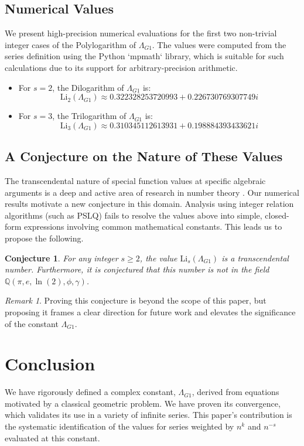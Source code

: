 \documentclass{amsart}
\theoremstyle{plain}
\newtheorem{conjecture}[theorem]{Conjecture}
\theoremstyle{definition}
\theoremstyle{remark}
\newtheorem*{remark}{Remark}
\newcommand{\LambdaG}{\Lambda_{G1}}
\begin{document}
\subsection{Numerical Values}
We present high-precision numerical evaluations for the first two non-trivial integer cases of the Polylogarithm of $\LambdaG$. The values were computed from the series definition using the Python `mpmath` library, which is suitable for such calculations due to its support for arbitrary-precision arithmetic.
\begin{itemize}
    \item For $s=2$, the Dilogarithm of $\LambdaG$ is:
    $$ \mathrm{Li}_2(\LambdaG) \approx 0.322328253720993 + 0.226730769307749i $$
    \item For $s=3$, the Trilogarithm of $\LambdaG$ is:
    $$ \mathrm{Li}_3(\LambdaG) \approx 0.310345112613931 + 0.198884393433621i $$
\end{itemize}

\subsection{A Conjecture on the Nature of These Values}
The transcendental nature of special function values at specific algebraic arguments is a deep and active area of research in number theory \cite{Lewin}. Our numerical results motivate a new conjecture in this domain. Analysis using integer relation algorithms (such as PSLQ) fails to resolve the values above into simple, closed-form expressions involving common mathematical constants. This leads us to propose the following.

\begin{conjecture}
For any integer $s \ge 2$, the value $\mathrm{Li}_s(\LambdaG)$ is a transcendental number. Furthermore, it is conjectured that this number is not in the field $\mathbb{Q}(\pi, e, \ln(2), \phi, \gamma)$.
\end{conjecture}
\begin{remark}
Proving this conjecture is beyond the scope of this paper, but proposing it frames a clear direction for future work and elevates the significance of the constant $\LambdaG$.
\end{remark}

\section{Conclusion}
We have rigorously defined a complex constant, $\LambdaG$, derived from equations motivated by a classical geometric problem. We have proven its convergence, which validates its use in a variety of infinite series. This paper's contribution is the systematic identification of the values for series weighted by $n^k$ and $n^{-s}$ evaluated at this constant.
\end{document}
